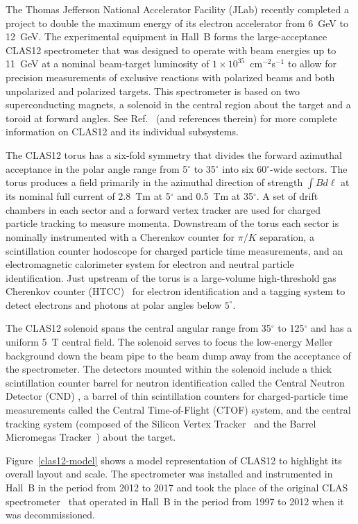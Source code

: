 \documentclass[3p,times,twocolumn]{elsarticle}
\begin{document}
The Thomas Jefferson National Accelerator Facility (JLab) recently completed a project to double the
maximum energy of its electron accelerator from 6~GeV to 12~GeV. The experimental equipment in
Hall~B forms the large-acceptance CLAS12 spectrometer that was designed to operate with beam
energies up to 11~GeV at a nominal beam-target luminosity of $1 \times 10^{35}$~cm$^{-2}$s$^{-1}$ to
allow for precision measurements of exclusive reactions with polarized beams and both unpolarized and
polarized targets. This spectrometer is based on two superconducting magnets, a solenoid in the central
region about the target and a toroid at forward angles. See Ref.~\cite{overview-nim} (and references
therein) for more complete information on CLAS12 and its individual subsystems. 

The CLAS12 torus has a six-fold symmetry that divides the forward azimuthal acceptance in the polar angle
range from 5$^\circ$ to 35$^\circ$ into six 60$^\circ$-wide sectors. The torus produces a field primarily in
the azimuthal direction of strength $\int \!B d\ell$ at its nominal full current of 2.8~Tm at 5$^\circ$ and
0.5~Tm at 35$^\circ$. A set of drift chambers in each sector and a forward vertex tracker are used for
charged particle tracking to measure momenta. Downstream of the torus each sector is nominally instrumented
with a Cherenkov counter for $\pi/K$ separation, a scintillation counter hodoscope for charged particle time
measurements, and an electromagnetic calorimeter system for electron and neutral particle identification.
Just upstream of the torus is a large-volume high-threshold gas Cherenkov counter (HTCC)~\cite{htcc-nim}
for electron identification and a tagging system to detect electrons and photons at polar angles below $5^\circ$.

The CLAS12 solenoid spans the central angular range from 35$^\circ$ to 125$^\circ$ and has a uniform 5~T
central field. The solenoid serves to focus the low-energy M{\o}ller background down the beam pipe to the
beam dump away from the acceptance of the spectrometer. The detectors mounted within the solenoid include
a thick scintillation counter barrel for neutron identification called the Central Neutron Detector (CND)
\cite{cnd-nim}, a barrel of thin scintillation counters for charged-particle time measurements called the
Central Time-of-Flight (CTOF) system, and the central tracking system (composed of the Silicon Vertex
Tracker~\cite{svt-nim} and the Barrel Micromegas Tracker~\cite{mm-nim}) about the target.

Figure~\ref{clas12-model} shows a model representation of CLAS12 to highlight its overall layout and scale.
The spectrometer was installed and instrumented in Hall~B in the period from 2012 to 2017 and took the
place of the original CLAS spectrometer~\cite{clas-nim} that operated in Hall~B in the period from 1997 to
2012 when it was decommissioned.
\end{document}
